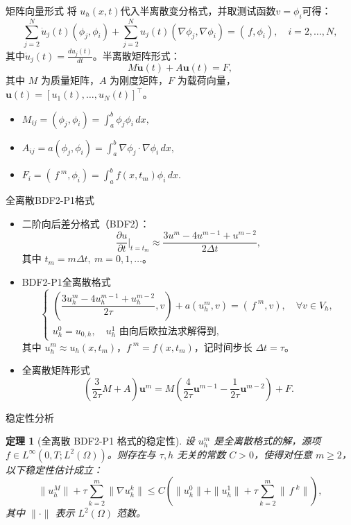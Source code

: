 \documentclass[aspectratio=169, xetex, 12pt]{beamer}  %
\newtheorem{thm}{定理}[section]
\begin{document}
	\begin{frame}{矩阵向量形式}
		将 $u_h(x,t)$代入半离散变分格式，并取测试函数$v=\phi_i$可得：
	\[	
	\sum_{j=2}^N \dot{u}_j(t)(\phi_j, \phi_i) + \sum_{j=2}^N u_j(t)(\nabla \phi_j, \nabla \phi_i) = (\, f, \phi_i), \quad i = 2, \dots, N,
	\]
		其中$\dot{u}_j(t)=\frac{d{u}_j(t)}{dt}$。半离散矩阵形式：
		\[	M\dot{\mathbf{u}}(t) + A\mathbf{u}(t) = F,\]
		其中 $M$ 为质量矩阵，$A$ 为刚度矩阵，$F$ 为载荷向量，$\mathbf{u}(t) = [u_1(t), \dots, u_N(t)]^\top$。
		\begin{itemize}
			\item $M_{ij} = (\phi_j, \phi_i) = \int_a^b \phi_j \phi_i \,dx,$
			\item $A_{ij} = a(\phi_j, \phi_i) = \int_a^b \nabla \phi_j \cdot \nabla \phi_i \,dx,$
			\item $F_i = (\, f^{\;m}, \phi_i) = \int_a^b f(x,t_m) \phi_i \,dx.$
		\end{itemize}
	\end{frame}
	\begin{frame}{全离散BDF2-P1格式}
			\begin{itemize}
		\item 二阶向后差分格式（BDF2）：
		\[
		\frac{\partial u}{\partial t} \bigg|_{t=t_m} \approx \frac{3u^m - 4u^{m-1} + u^{m-2}}{2\Delta t},
		\]
		其中 $t_m=m\Delta t,\ m=0,1,\dots$。
\item BDF2-P1全离散格式
			\[
			\begin{cases}
				\left( \dfrac{3u_h^m - 4u_h^{m-1} + u_h^{m-2}}{2\tau}, v\right) + a(u_h^m, v) = (\, f^{\;m}, v), \quad \forall v \in V_h, \\[8pt]
				u_h^0 = u_{0,h}, \quad u_h^1 \text{ 由向后欧拉法求解得到},
			\end{cases}
			\]
			其中 $u_h^m \approx u_h(x,t_m)$，$f^{\;m} = f(x, t_m)$，记时间步长 $\Delta t=\tau$。
			\item	全离散矩阵形式
			\[	\left( \frac{3}{2\tau} M + A\right) \mathbf{u}^m
			= M \left( \frac{4}{2\tau} \mathbf{u}^{m-1} - \frac{1}{2\tau} \mathbf{u}^{m-2} \right) + F.\]
	
		\end{itemize}
	\end{frame}
	\begin{frame}{稳定性分析}
		\begin{thm}[全离散 BDF2-P1 格式的稳定性]
			设 $u_h^m$ 是全离散格式的解，源项 $f \in L^\infty(0,T; L^2(\Omega))$。则存在与 $\tau, h$ 无关的常数 $C > 0$，使得对任意 $m \geq 2$，以下稳定性估计成立：
			\[
			\| u_h^M \| + \tau \sum_{k=2}^m \| \nabla u_h^k \| 
			\leq C \left( \| u_h^0 \| + \| u_h^1 \| + \tau \sum_{k=2}^m \| \,f^{\;k} \| \right),
			\]
			其中 $\|\cdot\|$ 表示 $L^2(\Omega)$ 范数。
		\end{thm}
	\end{frame}
	
\end{document}
